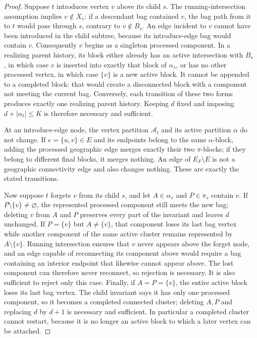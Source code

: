 \documentclass{article}
\begin{document}
\begin{proof}
Suppose \(t\) introduces vertex \(v\) above its child \(s\).  The running-intersection assumption implies \(v\notin X_s\): if a descendant bag contained \(v\), the bag path from it to \(t\) would pass through \(s\), contrary to \(v\notin B_s\).  An edge incident to \(v\) cannot have been introduced in the child subtree, because its introduce-edge bag would contain \(v\).  Consequently \(v\) begins as a singleton processed component.  In a realizing parent history, its block either already has an active intersection with \(B_s\), in which case \(v\) is inserted into exactly that block of \(\alpha_s\), or has no other processed vertex, in which case \(\{v\}\) is a new active block.  It cannot be appended to a completed block: that would create a disconnected block with a component not meeting the current bag.  Conversely, each transition of these two forms produces exactly one realizing parent history.  Keeping \(d\) fixed and imposing \(d+|\alpha_t|\le K\) is therefore necessary and sufficient.

At an introduce-edge node, the vertex partition \(\mathscr A_t\) and its active partition \(\alpha\) do not change.  If \(e=\{u,v\}\in E\) and its endpoints belong to the same \(\alpha\)-block, adding the processed geographic edge merges exactly their two \(\pi\)-blocks; if they belong to different final blocks, it merges nothing.  An edge of \(E_F\setminus E\) is not a geographic connectivity edge and also changes nothing.  These are exactly the stated transitions.

Now suppose \(t\) forgets \(v\) from its child \(s\), and let \(A\in\alpha_s\) and \(P\in\pi_s\) contain \(v\).  If \(P\setminus\{v\}\ne\varnothing\), the represented processed component still meets the new bag; deleting \(v\) from \(A\) and \(P\) preserves every part of the invariant and leaves \(d\) unchanged.  If \(P=\{v\}\) but \(A\ne\{v\}\), that component loses its last bag vertex while another component of the same active cluster remains represented by \(A\setminus\{v\}\).  Running intersection ensures that \(v\) never appears above the forget node, and an edge capable of reconnecting its component above would require a bag containing an interior endpoint that likewise cannot appear above.  The lost component can therefore never reconnect, so rejection is necessary.  It is also sufficient to reject only this case.  Finally, if \(A=P=\{v\}\), the entire active block loses its last bag vertex.  The child invariant says it has only one processed component, so it becomes a completed connected cluster; deleting \(A,P\) and replacing \(d\) by \(d+1\) is necessary and sufficient.  In particular a completed cluster cannot restart, because it is no longer an active block to which a later vertex can be attached.


\end{proof}
\end{document}
